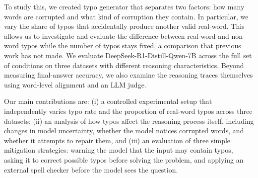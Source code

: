\documentclass[11pt]{article}
\begin{document}
To study this, we created typo generator that separates two factors: how many words are corrupted and what kind of corruption they contain. In particular, we vary the share of typos that accidentally produce another valid real-word. This allows us to investigate and evaluate the difference between real-word and non-word typos while the number of typos stays fixed, a comparison that previous work has not made. We evaluate DeepSeek-R1-Distill-Qwen-7B \citep{guo2025} across the full set of conditions on three datasets with different reasoning characteristics. Beyond measuring final-answer accuracy, we also examine the reasoning traces themselves using word-level alignment and an LLM judge.

Our main contributions are: (i) a controlled experimental setup that independently varies typo rate and the proportion of real-word typos across three datasets; (ii) an analysis of how typos affect the reasoning process itself, including changes in model uncertainty, whether the model notices corrupted words, and whether it attempts to repair them, and (iii) an evaluation of three simple mitigation strategies: warning the model that the input may contain typos, asking it to correct possible typos before solving the problem, and applying an external spell checker before the model sees the question.
\end{document}
